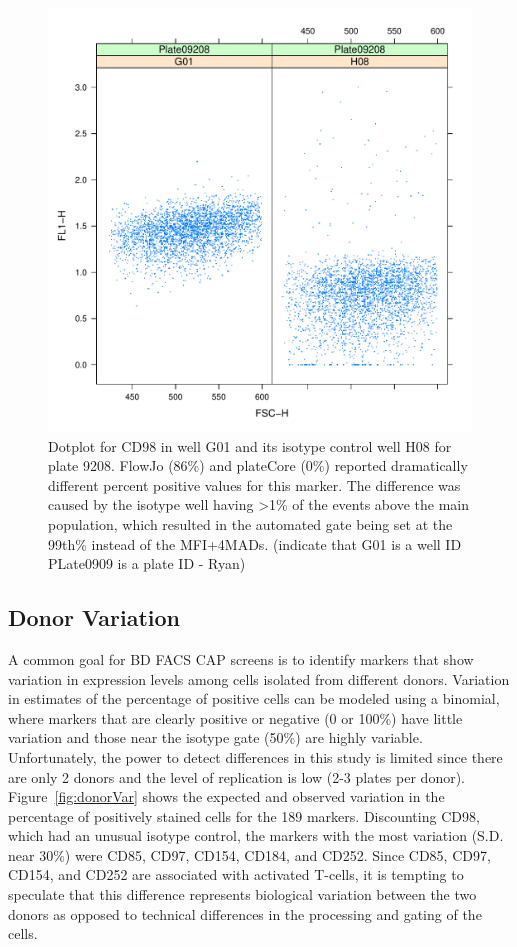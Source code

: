 \documentclass[12pt]{article}
\begin{document}
\clearpage
\begin{figure}
\centering
\includegraphics{fjVSr2.pdf}
\caption{Dotplot for CD98 in well G01 and its isotype control well H08 for
plate 9208. FlowJo (86\%) and plateCore (0\%) reported dramatically different
percent positive values for this marker. The  difference was caused by the
isotype well having >1\% of the events above the main population, which
resulted in the automated gate being set at the 99th\% instead of the
MFI+4MADs. (indicate that G01 is a well ID PLate0909 is a plate ID - Ryan)}
\label{fig:disagree}
\end{figure}


\clearpage
\subsection*{Donor Variation}

A common goal for BD FACS CAP screens is to identify markers that show
variation in expression levels among cells isolated from different donors.
Variation in estimates of the percentage of positive cells can be modeled using
a binomial, where markers that are clearly positive or negative (0 or 100\%)
have little variation and those near the isotype gate (50\%) are highly
variable. Unfortunately, the power to detect differences in this study is
limited since there are only 2 donors and the level of replication is low (2-3
plates per donor). Figure~\ref{fig:donorVar} shows  the expected and observed
variation in the percentage of positively stained cells for the 189 markers.
Discounting CD98, which had an unusual isotype control, the markers with the
most variation (S.D. near 30\%) were CD85, CD97, CD154, CD184, and CD252. Since
CD85, CD97, CD154, and CD252 are associated with activated T-cells, it is
tempting to speculate that this difference represents biological variation
between the two donors as opposed to technical differences in the processing
and gating of the cells.
\end{document}
